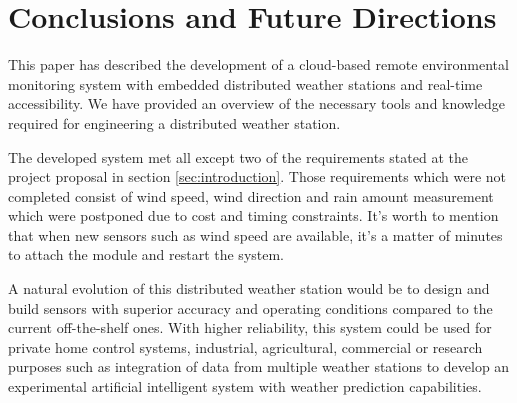 \section{Conclusions and Future Directions}
\label{sec:conclusions}
This paper has described the development of a cloud-based remote environmental
monitoring system with embedded distributed weather stations and real-time accessibility.
We have provided an overview of the necessary tools and knowledge required
for engineering a distributed weather station.

The developed system met all except two of the requirements stated at the project proposal in section \ref{sec:introduction}.
Those requirements which were not completed consist of wind speed, wind direction and rain amount measurement which
were postponed due to cost and timing constraints. It's worth to mention that when new sensors such as wind speed are available,
it's a matter of minutes to attach the module and restart the system.

A natural evolution of this distributed weather station would be to design and build sensors with superior
accuracy and operating conditions compared to the current off-the-shelf ones. With higher reliability,
this system could be used for private home control systems, industrial, agricultural, commercial or research purposes such as integration of
data from multiple weather stations to develop an experimental artificial intelligent system
with weather prediction capabilities. 
